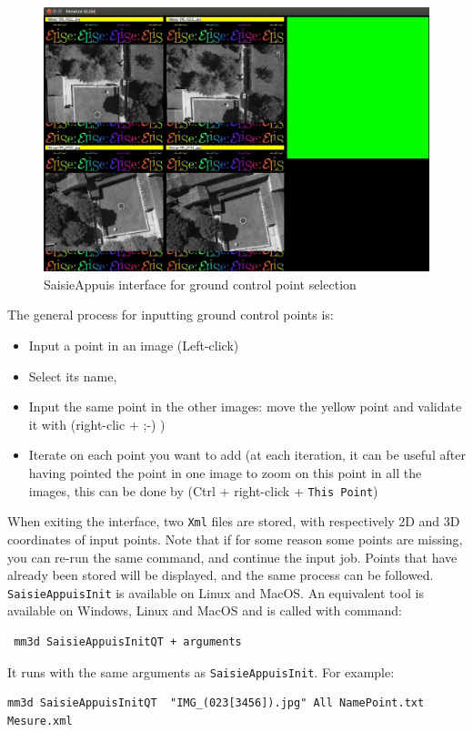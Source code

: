 \begin{figure}[H]
\begin{center}
\includegraphics[width=160mm]{FIGS/Saisie/interface.jpg}
\end{center}
\caption{SaisieAppuis interface for ground control point selection}
\label{FIG:SaisieAppuis:interface}
\end{figure}

The general process for inputting ground control points is:
\begin{itemize}
\item Input a point in an image (Left-click)
\item Select its name,
\item Input the same point in the other images: move the yellow point and validate it with (right-clic + ;-) )
\item Iterate on each point you want to add (at each iteration, it can be useful after having pointed the point in one image to zoom on this point in all the images,
this can be done by (Ctrl + right-click + {\tt This Point})
\end{itemize}

When exiting the interface, two {\tt Xml} files are stored, with respectively 2D and 3D coordinates of input points.
Note that if for some reason some points are missing, you can re-run the same command, and continue the input job.
Points that have already been stored will be displayed, and the same process can be followed.\\

{\tt SaisieAppuisInit} is available on Linux and MacOS.
An equivalent tool is available on Windows, Linux and MacOS and is called with command: \begin{verbatim} mm3d SaisieAppuisInitQT + arguments \end{verbatim}
It runs with the same arguments as {\tt SaisieAppuisInit}. For example:
\begin{verbatim}
mm3d SaisieAppuisInitQT  "IMG_(023[3456]).jpg" All NamePoint.txt  Mesure.xml
\end{verbatim}

